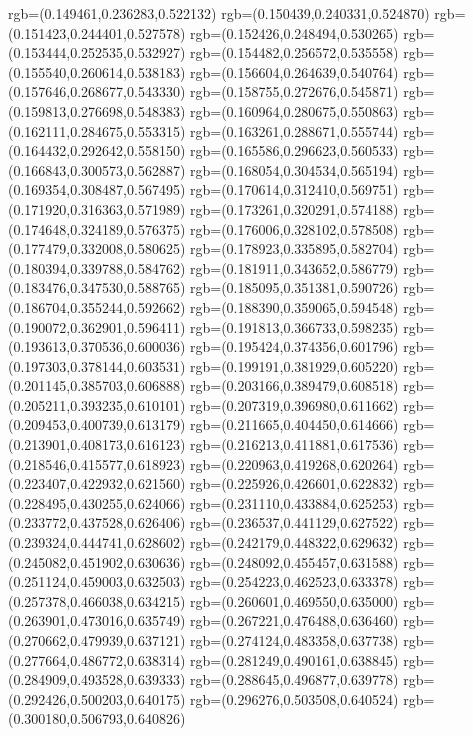 {{{			rgb=(0.149461,0.236283,0.522132)
			rgb=(0.150439,0.240331,0.524870)
			rgb=(0.151423,0.244401,0.527578)
			rgb=(0.152426,0.248494,0.530265)
			rgb=(0.153444,0.252535,0.532927)
			rgb=(0.154482,0.256572,0.535558)
			rgb=(0.155540,0.260614,0.538183)
			rgb=(0.156604,0.264639,0.540764)
			rgb=(0.157646,0.268677,0.543330)
			rgb=(0.158755,0.272676,0.545871)
			rgb=(0.159813,0.276698,0.548383)
			rgb=(0.160964,0.280675,0.550863)
			rgb=(0.162111,0.284675,0.553315)
			rgb=(0.163261,0.288671,0.555744)
			rgb=(0.164432,0.292642,0.558150)
			rgb=(0.165586,0.296623,0.560533)
			rgb=(0.166843,0.300573,0.562887)
			rgb=(0.168054,0.304534,0.565194)
			rgb=(0.169354,0.308487,0.567495)
			rgb=(0.170614,0.312410,0.569751)
			rgb=(0.171920,0.316363,0.571989)
			rgb=(0.173261,0.320291,0.574188)
			rgb=(0.174648,0.324189,0.576375)
			rgb=(0.176006,0.328102,0.578508)
			rgb=(0.177479,0.332008,0.580625)
			rgb=(0.178923,0.335895,0.582704)
			rgb=(0.180394,0.339788,0.584762)
			rgb=(0.181911,0.343652,0.586779)
			rgb=(0.183476,0.347530,0.588765)
			rgb=(0.185095,0.351381,0.590726)
			rgb=(0.186704,0.355244,0.592662)
			rgb=(0.188390,0.359065,0.594548)
			rgb=(0.190072,0.362901,0.596411)
			rgb=(0.191813,0.366733,0.598235)
			rgb=(0.193613,0.370536,0.600036)
			rgb=(0.195424,0.374356,0.601796)
			rgb=(0.197303,0.378144,0.603531)
			rgb=(0.199191,0.381929,0.605220)
			rgb=(0.201145,0.385703,0.606888)
			rgb=(0.203166,0.389479,0.608518)
			rgb=(0.205211,0.393235,0.610101)
			rgb=(0.207319,0.396980,0.611662)
			rgb=(0.209453,0.400739,0.613179)
			rgb=(0.211665,0.404450,0.614666)
			rgb=(0.213901,0.408173,0.616123)
			rgb=(0.216213,0.411881,0.617536)
			rgb=(0.218546,0.415577,0.618923)
			rgb=(0.220963,0.419268,0.620264)
			rgb=(0.223407,0.422932,0.621560)
			rgb=(0.225926,0.426601,0.622832)
			rgb=(0.228495,0.430255,0.624066)
			rgb=(0.231110,0.433884,0.625253)
			rgb=(0.233772,0.437528,0.626406)
			rgb=(0.236537,0.441129,0.627522)
			rgb=(0.239324,0.444741,0.628602)
			rgb=(0.242179,0.448322,0.629632)
			rgb=(0.245082,0.451902,0.630636)
			rgb=(0.248092,0.455457,0.631588)
			rgb=(0.251124,0.459003,0.632503)
			rgb=(0.254223,0.462523,0.633378)
			rgb=(0.257378,0.466038,0.634215)
			rgb=(0.260601,0.469550,0.635000)
			rgb=(0.263901,0.473016,0.635749)
			rgb=(0.267221,0.476488,0.636460)
			rgb=(0.270662,0.479939,0.637121)
			rgb=(0.274124,0.483358,0.637738)
			rgb=(0.277664,0.486772,0.638314)
			rgb=(0.281249,0.490161,0.638845)
			rgb=(0.284909,0.493528,0.639333)
			rgb=(0.288645,0.496877,0.639778)
			rgb=(0.292426,0.500203,0.640175)
			rgb=(0.296276,0.503508,0.640524)
			rgb=(0.300180,0.506793,0.640826)
}}}
